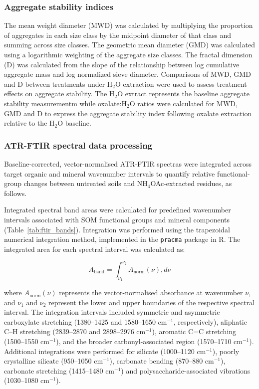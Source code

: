 \documentclass[preprint,12pt]{elsarticle}
\begin{document}
\subsubsection{Aggregate stability indices}

The mean weight diameter (MWD) was calculated by multiplying the proportion of aggregates in each size class by the midpoint diameter of that class and summing across size classes. The geometric mean diameter (GMD) was calculated using a logarithmic weighting of the aggregate size classes. The fractal dimension (D) was calculated from the slope of the relationship between log cumulative aggregate mass and log normalized sieve diameter. Comparisons of MWD, GMD and D between treatments under H$_2$O extraction were used to assess treatment effects on aggregate stability. The H$_2$O extract represents the baseline aggregate stability measurementm while oxalate:H$_2$O ratios were calculated for MWD, GMD and D to express the aggregate stability index following oxalate extraction relative to the H$_2$O baseline.

\subsubsection{ATR-FTIR spectral data processing}
Baseline-corrected, vector-normalised ATR-FTIR spectras were integrated across target organic and mineral wavenumber intervals to quantify relative functional-group changes between untreated soils and NH$_4$OAc-extracted residues, as follows.

Integrated spectral band areas were calculated for predefined wavenumber intervals associated with SOM functional groups and mineral components (Table~\ref{tab:ftir_bands}). Integration was performed using the trapezoidal numerical integration method, implemented in the \texttt{pracma} package in R. The integrated area for each spectral interval was calculated as:

\begin{equation}
A_{\mathrm{band}} =
\int_{\nu_1}^{\nu_2}
A_{\mathrm{norm}}(\nu),d\nu
\label{eq:ftir_band_integration}
\end{equation}

where $A_{\mathrm{norm}}(\nu)$ represents the vector-normalised absorbance at wavenumber $\nu$, and $\nu_1$ and $\nu_2$ represent the lower and upper boundaries of the respective spectral interval. The integration intervals included symmetric and asymmetric carboxylate stretching (1380--1425 and 1580--1650 cm$^{-1}$, respectively), aliphatic C--H stretching (2839--2870 and 2898--2976 cm$^{-1}$), aromatic C=C stretching (1500--1550 cm$^{-1}$), and the broader carbonyl-associated region (1570--1710 cm$^{-1}$). Additional integrations were performed for silicate (1000--1120 cm$^{-1}$), poorly crystalline silicate (950--1050 cm$^{-1}$), carbonate bending (870--880 cm$^{-1}$), carbonate stretching (1415--1480 cm$^{-1}$) and polysaccharide-associated vibrations (1030--1080 cm$^{-1}$).
\end{document}
